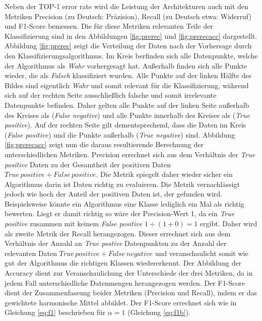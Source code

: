 Neben der TOP-1 error rate wird die Leistung der Architekturen auch mit den Metriken Precision (zu Deutsch: Präzision), Recall (zu Deutsch etwa: Widerruf) und F1-Score bemessen. Die für diese Metriken relevanten Teile der Klassifizierung sind in den Abbildungen \ref{fig:prerec} und \ref{fig:prerecacc} dargestellt. Abbildung \ref{fig:prerec} zeigt die Verteilung der Daten nach der Vorhersage durch den Klassifizierungsalgorithmus. Im Kreis berfinden sich alle Datenpunkte, welche der Algorithmus als \textit{Wahr} vorhergesagt hat. Außerhalb finden sich alle Punkte wieder, die als \textit{Falsch} klassifiziert wurden. Alle Punkte auf der linken Hälfte des Bildes sind eigentlich \textit{Wahr} und somit relevant für die Klassifizierung, während sich auf der rechten Seite ausschließlich falsche und somit irrelevante Datenpunkte befinden. Daher gelten alle Punkte auf der linken Seite  außerhalb des Kreises als (\textit{False negative}) und alle Punkte innerhalb des Kreises als (\textit{True positive}). Auf der rechten Seite gilt dementsprechend, dass die Daten im Kreis (\textit{False positive}) und die Punkte außerhalb  (\textit{True negative}) sind. Abbildung \ref{fig:prerecacc} zeigt nun die daraus resultierende Berechnung der unterschiedlichen Metriken. Precision errechnet sich aus dem Verhältnis der \textit{True positive} Daten zu der Gesamtheit der positiven Daten $True\,positive + False\,positive$. Die Metrik spiegelt daher wieder sicher ein Algorithmus darin ist Daten richtig zu evaluieren. Die Metrik vernachlässigt jedoch wie hoch der Anteil der positiven Daten ist, der gefunden wird. Beispielsweise könnte ein Algorithmus eine Klasse lediglich ein Mal als richtig bewerten. Liegt er damit richtig so wäre der Precision-Wert 1, da ein \textit{True positive} zusammen mit keinem \textit{False positive} $1 \div (1+0) = 1$ ergibt. Daher wird als zweite Metrik der Recall herangezogen. Dieser errechnet sich aus dem Verhältnis der Anzahl an \textit{True postive} Datenpunkten zu der Anzahl der relevanten Daten $True\,positive + False\,negative$ und veranschaulicht somit wie gut der Algorithmus die richtigen Klassen wiedererkennt. Der Abbildung der Accuracy dient zur Veranschaulichung der Unterschiede der drei Metriken, da in jedem Fall unterschiedliche Datenmengen herangezogen werden. Der F1-Score dient der Zusammenfassung beider Metriken (Precision und Recall), indem er das gewichtete harmonische Mittel abbildet. Der F1-Score errechnet sich wie in Gleichung \ref{eq:f1} beschrieben für $\alpha = 1$ (Gleichung \ref{eq:f1b}). 

